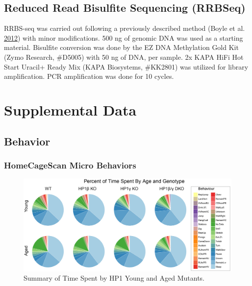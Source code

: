 \documentclass[onehalf,12pt]{beavtex}
\begin{document}
  \section{Reduced Read Bisulfite Sequencing
  (RRBSeq)}\label{reduced-read-bisulfite-sequencing-rrbseq}
  
  RRBS-seq was carried out following a previously described method (Boyle
  et al. \protect\hyperlink{ref-BoyleGelfreemultiplexedreduced2012}{2012})
  with minor modifications. 500 ng of genomic DNA was used as a starting
  material. Bisulfite conversion was done by the EZ DNA Methylation Gold
  Kit (Zymo Research, \#D5005) with 50 ng of DNA, per sample. 2x KAPA HiFi
  Hot Start Uracil+ Ready Mix (KAPA Biosystems, \#KK2801) was utilized for
  library amplification. PCR amplification was done for 10 cycles.
  
  \appendix
  
  \chapter{Supplemental Data}\label{supplemental-data}
  
  \section{Behavior}\label{Behavsupplement}
  
  \subsection{HomeCageScan Micro
  Behaviors}\label{homecagescan-micro-behaviors}
  
  \begin{figure}
  
  {\centering \includegraphics[width=1\linewidth, ]{./figure/results/HCSpercentpie} 
  
  }
  
  \caption[Summary of Time Spent by HP1 Young and Aged Mutants]{Summary of Time Spent by HP1 Young and Aged Mutants. }\label{fig:HCSpie}
  \end{figure}
  
\end{document}
